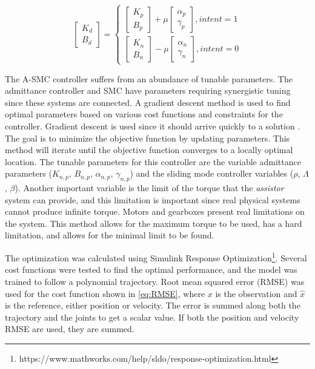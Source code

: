 \begin{equation}
    \begin{bmatrix} K_d \\ B_d \end{bmatrix} = \begin{cases}
        \begin{bmatrix} K_{p} \\ B_{p} \end{bmatrix} + \mu  \begin{bmatrix} \alpha_p  \\ \gamma_p \end{bmatrix}, intent = 1 \\
        \begin{bmatrix} K_{n} \\ B_{n} \end{bmatrix} - \mu  \begin{bmatrix} \alpha_n  \\ \gamma_n \end{bmatrix}, intent = 0
  \end{cases}
  \label{eq:varible}
\end{equation}


The A-SMC controller suffers from an abundance of tunable parameters. The admittance controller and SMC have parameters requiring synergistic tuning since these systems are connected.  A gradient descent method is used to find optimal parameters based on various cost functions and constraints for the controller.  Gradient descent is used since it should arrive quickly to a solution  \cite{piltan2012performance} \cite{wang1996course}. The goal is to minimize the objective function by updating parameters. This method will iterate until the objective function converges to a locally optimal location. The tunable parameters for this controller are the variable admittance parameters ($K_{n,p}$, $B_{n,p}$, $\alpha_{n,p}$, $\gamma_{n,p}$) and the sliding mode controller variables ($\rho$, $\Lambda$, $\beta$).  Another important variable is the limit of the torque that the \textit{assistor} system can provide, and this limitation is important since real physical systems cannot produce infinite torque. Motors and gearboxes present real limitations on the system. This method allows for the maximum torque to be used, has a hard limitation, and allows for the minimal limit to be found.


The optimization was calculated using Simulink Response Optimization\footnote{https://www.mathworks.com/help/sldo/response-optimization.html}. Several cost functions were tested to find the optimal performance, and the model was trained to follow a polynomial trajectory. Root mean squared error (RMSE) was used for the cost function shown in \autoref{eq:RMSE}, where $x$ is the observation and $\hat{x}$ is the reference, either position or velocity. The error is summed along both the trajectory and the joints to get a scalar value. If both the position and velocity RMSE are used, they are summed.

